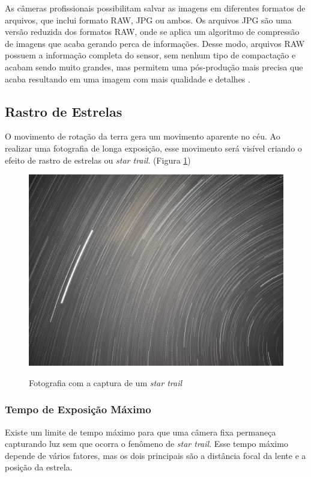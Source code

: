 As câmeras profissionais possibilitam salvar as imagens em diferentes formatos de arquivos, que inclui formato RAW, JPG ou ambos. Os arquivos JPG são uma versão reduzida dos formatos RAW, onde se aplica um algoritmo de compressão de imagens que acaba gerando perca de informações. Desse modo, arquivos RAW possuem a informação completa do sensor, sem nenhum tipo de compactação e acabam sendo muito grandes, mas permitem uma pós-produção mais precisa que acaba resultando em uma imagem com mais qualidade e detalhes \cite{book:bbcsky}.

\subsection{Rastro de Estrelas}

O movimento de rotação da terra gera um movimento aparente no céu. Ao realizar uma fotografia de longa exposição, esse movimento será visível criando o efeito de rastro de estrelas ou \textit{star trail}. (Figura \ref{fig:startrail_example})

\begin{figure}[!htb]
	\centering
	\caption{Fotografia com a captura de um \textit{star trail}}
	\includegraphics[width=0.7\linewidth]{figuras/revisaobiblio/startrail_example}
	\label{fig:startrail_example}
\end{figure}

\subsubsection{Tempo de Exposição Máximo}
\label{sec:TempoMax}

Existe um limite de tempo máximo para que uma câmera fixa permaneça capturando luz sem que ocorra o fenômeno de \textit{star trail}. Esse tempo máximo depende de vários fatores, mas os dois principais são a distância focal da lente e a posição da estrela.


